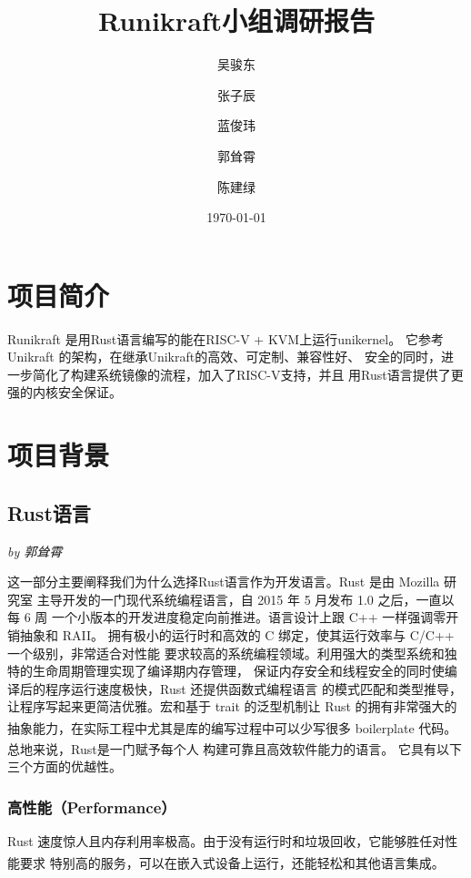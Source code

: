 \documentclass[UTF8,fontset=none,linespread=1.15]{ctexart}
\let\nosupcite\cite
\renewcommand*{\cite}[1]{\textsuperscript{\nosupcite{#1}}}
\newcommand{\sectionauthor}[1]{%
\vspace*{-5ex}
\noindent\textrm{\hfill\textit{by #1}}
\vspace*{2ex}\par}
\begin{document}
\sffamily %
\title{\bfseries Runikraft小组\quad 调研报告}
\author{吴骏东\and 张子辰\and 蓝俊玮\and 郭耸霄\and 陈建绿}
\date{\today}
\maketitle

\tableofcontents

\section{项目简介}
Runikraft 是用Rust语言编写的能在RISC-V + KVM上运行unikernel。
它参考 Unikraft 的架构，在继承Unikraft的高效、可定制、兼容性好、
安全的同时，进一步简化了构建系统镜像的流程，加入了RISC-V支持，并且
用Rust语言提供了更强的内核安全保证。
\section{项目背景}
\subsection{Rust语言}\sectionauthor{郭耸霄}

这一部分主要阐释我们为什么选择Rust语言作为开发语言。Rust 是由 Mozilla 研究室
主导开发的一门现代系统编程语言，自 2015 年 5 月发布 1.0 之后，一直以每 6 周
一个小版本的开发进度稳定向前推进。语言设计上跟 C++ 一样强调零开销抽象和 RAII。
拥有极小的运行时和高效的 C 绑定，使其运行效率与 C/C++ 一个级别，非常适合对性能
要求较高的系统编程领域。利用强大的类型系统和独特的生命周期管理实现了编译期内存管理，
保证内存安全和线程安全的同时使编译后的程序运行速度极快，Rust 还提供函数式编程语言
的模式匹配和类型推导，让程序写起来更简洁优雅。宏和基于 trait 的泛型机制让 Rust
的拥有非常强大的抽象能力，在实际工程中尤其是库的编写过程中可以少写很多 boilerplate
代码。\cite{bib:2-why-rust}
总地来说，Rust是一门赋予每个人 构建可靠且高效软件能力的语言。\cite{bib:1-rust-lang}
它具有以下三个方面的优越性。

\subsubsection{高性能（Performance）}

Rust 速度惊人且内存利用率极高。由于没有运行时和垃圾回收，它能够胜任对性能要求
特别高的服务，可以在嵌入式设备上运行，还能轻松和其他语言集成。\cite{bib:1-rust-lang}
\end{document}
